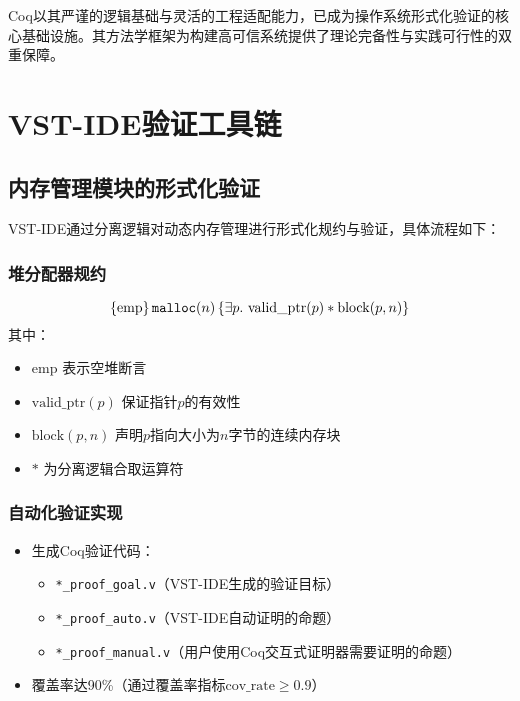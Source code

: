 \noindent Coq以其严谨的逻辑基础与灵活的工程适配能力，已成为操作系统形式化验证的核心基础设施。其方法学框架为构建高可信系统提供了理论完备性与实践可行性的双重保障。
\section{VST-IDE验证工具链}
\label{sec:vst-ide}

\subsection{内存管理模块的形式化验证}
\label{subsec:mem-verification}

\noindent VST-IDE通过分离逻辑对动态内存管理进行形式化规约与验证，具体流程如下：

\subsubsection{堆分配器规约}
\begin{equation}
\label{eq:malloc-spec}
\hoare{\mathrm{emp}}{\mathtt{malloc}(n)}{\exists p.\ \mathrm{valid\_ptr}(p) \ast \mathrm{block}(p, n)}
\end{equation}
\noindent 其中：
\begin{itemize}
    \item $\mathrm{emp}$ 表示空堆断言
    \item $\mathrm{valid\_ptr}(p)$ 保证指针$p$的有效性
    \item $\mathrm{block}(p, n)$ 声明$p$指向大小为$n$字节的连续内存块
    \item $\ast$ 为分离逻辑合取运算符
\end{itemize}

\subsubsection{自动化验证实现}
\begin{itemize}
    \item 生成Coq验证代码：
    \begin{itemize}
        \item \texttt{*\_proof\_goal.v}（VST-IDE生成的验证目标）
        \item \texttt{*\_proof\_auto.v}（VST-IDE自动证明的命题）
        \item \texttt{*\_proof\_manual.v}（用户使用Coq交互式证明器需要证明的命题）
    \end{itemize}
    \item 覆盖率达90\%（通过覆盖率指标$\mathrm{cov\_rate} \geq 0.9$）
\end{itemize}

